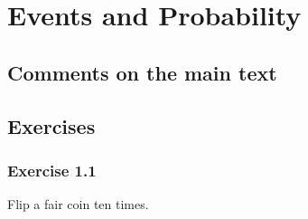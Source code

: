 \chapter{Events and Probability}

\section{Comments on the main text}

\section{Exercises}

\subsection*{Exercise 1.1}

Flip a fair coin ten times.

